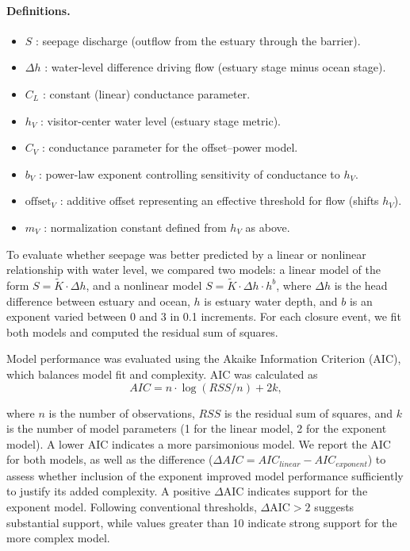 \documentclass[preprint,12pt,authoryear]{elsarticle}
\begin{document}
\paragraph{Definitions.}
\begin{itemize}
  \item $S$ : seepage discharge (outflow from the estuary through the barrier).
  \item $\Delta h$ : water-level difference driving flow (estuary stage minus ocean stage).
  \item $C_L$ : constant (linear) conductance parameter.
  \item $h_V$ : visitor-center water level (estuary stage metric).
  \item $C_V$ : conductance parameter for the offset--power model.
  \item $b_V$ : power-law exponent controlling sensitivity of conductance to $h_V$.
  \item $\mathrm{offset}_V$ : additive offset representing an effective threshold for flow (shifts $h_V$).
  \item $m_V$ : normalization constant defined from $h_V$ as above.
\end{itemize}



To evaluate whether seepage was better predicted by a linear or nonlinear relationship with water level, we compared two models: a linear model of the form $S = \tilde{K} \cdot \Delta h$, and a nonlinear model $S = \tilde{K} \cdot \Delta h \cdot h^b$, where $\Delta h$ is the head difference between estuary and ocean, $h$ is estuary water depth, and $b$ is an exponent varied between 0 and 3 in 0.1 increments. For each closure event, we fit both models and computed the residual sum of squares.

Model performance was evaluated using the Akaike Information Criterion (AIC), which balances model fit and complexity. AIC was calculated as
\begin{equation}
    {AIC} = n \cdot \log({RSS}/n) + 2k,
\end{equation}

where $n$ is the number of observations, ${RSS}$ is the residual sum of squares, and $k$ is the number of model parameters (1 for the linear model, 2 for the exponent model). A lower AIC indicates a more parsimonious model. We report the AIC for both models, as well as the difference ($\Delta {AIC} = {AIC}_{{linear}} - {AIC}_{{exponent}}$) to assess whether inclusion of the exponent improved model performance sufficiently to justify its added complexity.
 A positive $\Delta \text{AIC}$ indicates support for the exponent model. Following conventional thresholds, $\Delta \text{AIC} > 2$ suggests substantial support, while values greater than 10 indicate strong support for the more complex model.
\end{document}
